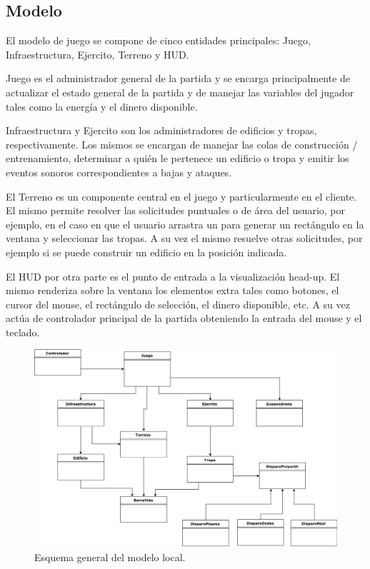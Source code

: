 \documentclass[titlepage,a4paper,12pt]{article}
\begin{document}
\subsection{Modelo}
El modelo de juego se compone de cinco entidades principales: Juego, Infraestructura, Ejercito, Terreno y HUD. 

Juego es el administrador general de la partida y se encarga principalmente de actualizar el estado general de la partida y de manejar las variables del jugador tales como la energía y el dinero disponible.

Infraestructura y Ejercito son los administradores de edificios y tropas, respectivamente. Los mismos se encargan de manejar las colas de construcción / entrenamiento, determinar a quién le pertenece un edificio o tropa y emitir los eventos sonoros correspondientes a bajas y ataques.

El Terreno es un componente central en el juego y particularmente en el cliente. El mismo permite resolver las solicitudes puntuales o de área del usuario, por ejemplo, en el caso en que el usuario arrastra un para generar un rectángulo en la ventana y seleccionar las tropas. A su vez el mismo resuelve otras solicitudes, por ejemplo si se puede construir un edificio en la posición indicada.

El HUD por otra parte es el punto de entrada a la visualización head-up. El mismo renderiza sobre la ventana los elementos extra tales como botones, el cursor del mouse, el rectángulo de selección, el dinero disponible, etc. A su vez actúa de controlador principal de la partida obteniendo la entrada del mouse y el teclado.

\begin{figure}[H]
	\centering
	\includegraphics[width=14cm]{../imagenes/esquema-cliente-modelo.jpg}
	\caption{\label{fig:esquema-cliente-modelo} Esquema general del modelo local.}
\end{figure}
\end{document}
